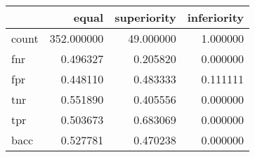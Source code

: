 \begin{tabular}{lrrr}
\toprule
{} &       equal &  superiority &  inferiority \\
\midrule
count &  352.000000 &    49.000000 &     1.000000 \\
fnr   &    0.496327 &     0.205820 &     0.000000 \\
fpr   &    0.448110 &     0.483333 &     0.111111 \\
tnr   &    0.551890 &     0.405556 &     0.000000 \\
tpr   &    0.503673 &     0.683069 &     0.000000 \\
bacc  &    0.527781 &     0.470238 &     0.000000 \\
\bottomrule
\end{tabular}
